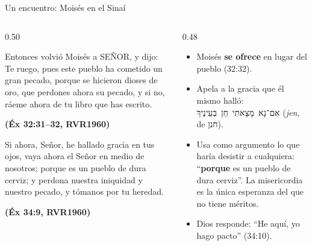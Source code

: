 \documentclass[hyperref={bookmarks=false},aspectratio=169]{beamer}
\newcommand{\heb}[1]{\mbox{\foreignlanguage{hebrew}{#1}}}
\newcommand{\SENOR}{S{\fontsize{0.78em}{1em}\selectfont EÑOR}}
\newcommand{\fuente}[1]{\par\hfill{\upshape\bfseries\footnotesize\textcolor{azul}{#1}}}
\newcommand{\destacar}[1]{\textbf{\textcolor{azul}{#1}}}
\begin{document}
\begin{frame}{Un encuentro: Moisés en el Sinaí}
\begin{columns}[t,onlytextwidth]
\begin{column}{0.50\textwidth}
\begin{cita}Entonces volvió Moisés a \SENOR, y dijo: Te ruego, pues este pueblo ha cometido un gran pecado, porque se hicieron dioses de oro, que perdones ahora su pecado, y si no, ráeme ahora de tu libro que has escrito.\fuente{(Éx 32:31--32, RVR1960)}\end{cita}
\begin{cita}Si ahora, Señor, he hallado gracia en tus ojos, vaya ahora el Señor en medio de nosotros; porque es un pueblo de dura cerviz; y perdona nuestra iniquidad y nuestro pecado, y tómanos por tu heredad.\fuente{(Éx 34:9, RVR1960)}\end{cita}
\end{column}
\begin{column}{0.48\textwidth}\small
\begin{itemize}
\item Moisés \destacar{se ofrece} en lugar del pueblo (32:32).
\item Apela a la gracia que él mismo halló: \heb{אִם־נָא מָצָאתִי חֵן בְּעֵינֶיךָ} (\emph{jen}, de \heb{חנן}).
\item Usa como argumento lo que haría desistir a cualquiera: ``\destacar{porque} es un pueblo de dura cerviz''. La misericordia es la única esperanza del que no tiene méritos.
\item Dios responde: ``He aquí, yo hago pacto'' (34:10).
\end{itemize}
\end{column}
\end{columns}
\end{frame}
\end{document}
